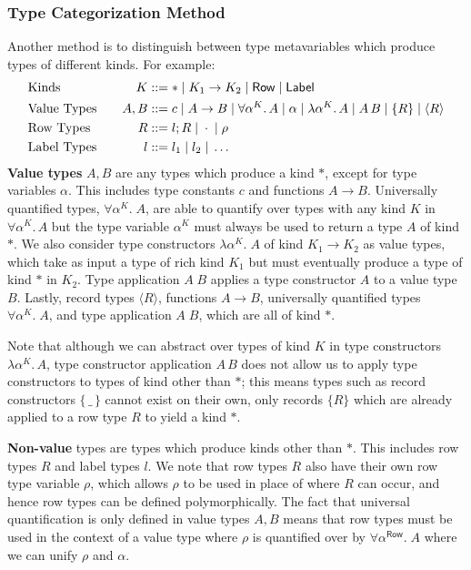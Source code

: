 \documentclass[acmsmall, 9pt]{article}
\begin{document}
\subsubsection{Type Categorization Method \cite{hillerstrom2016liberating}}
\label{sssec:type-categorization-method}
Another method is to distinguish between type metavariables which produce types of different kinds. For example:
\begin{align*}
&\text{Kinds} \quad &K &::= * \; | \; K_1 \rightarrow K_2 \; | \; \mathsf{Row} \; | \; \mathsf{Label}\\
&\text{Value Types} \quad  &A, B &::= c \; | \; A \rightarrow B \; | \; \forall \alpha^K . \, A\; | \; \alpha \; | \; \lambda \alpha^K. \, A \; | \; A \, B \; | \; \{ R \} \; | \; \langle R \rangle\\
&\text{Row Types} \quad &R &::= l; R \; | \; \cdot \; | \; \rho \\
&\text{Label Types} \quad &l &::= l_1 \; | \; l_2 \; | \; \ldots
\end{align*}
\textbf{Value types} $A,B$ are any types which produce a kind $*$, except for type variables $\alpha$. This includes type constants $c$ and functions $A \rightarrow B$. Universally quantified types, $\forall \alpha^K . \; A$, are able to quantify over types with any kind $K$ in $\forall \alpha^K. \, A$ but the type variable $\alpha^K$ must always be used to return a type $A$ of kind $*$. We also consider type constructors $\lambda \alpha^K. \; A$ of kind $K_1 \rightarrow K_2$ as value types, which take as input a type of rich kind $K_1$ but must eventually produce a type of kind $*$ in $K_2$. Type application $A\;B$ applies a type constructor $A$ to a value type $B$. Lastly, record types $\langle R \rangle$, functions $A \rightarrow B$, universally quantified types $\forall \alpha^K . \; A$, and type application $A\;B$, which are all of kind $*$.

Note that although we can abstract over types of kind $K$ in type constructors $\lambda \alpha^K. \, A$, type constructor application $A\,B$ does not allow us to apply type constructors to types of kind other than $*$; this means types such as record constructors $\{ \, \_ \, \}$ cannot exist on their own, only records $\{ R \}$ which are already applied to a row type $R$ to yield a kind $*$.

\lbreak
\textbf{Non-value} types are types which produce kinds other than $*$. This includes row types $R$ and label types $l$. We note that row types $R$ also have their own row type variable $\rho$, which allows $\rho$ to be used in place of where $R$ can occur, and hence row types can be defined polymorphically. The fact that universal quantification is only defined in value types $A, B$ means that row types must be used in the context of a value type where $\rho$ is quantified over by $\forall \alpha^\mathsf{Row} . \; A$ where we can unify $\rho$ and $\alpha$.
\end{document}
